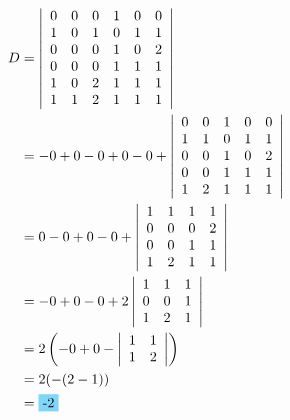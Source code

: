 \begin{align*}
	D&=\left|
	\begin{array}{cccccc}
		0&0&0&1&0&0 \\
		1&0&1&0&1&1 \\
		0&0&0&1&0&2 \\
		0&0&0&1&1&1 \\
		1&0&2&1&1&1 \\
		1&1&2&1&1&1 \\
	\end{array}
	\right| \\
	&= -0+0-0+0-0+\left|
	\begin{array}{ccccc}
		0&0&1&0&0 \\
		1&1&0&1&1 \\
		0&0&1&0&2 \\
		0&0&1&1&1 \\
		1&2&1&1&1 \\
	\end{array}
	\right| \\
	&= 0-0+0-0+\left|
	\begin{array}{cccc}
		1&1&1&1 \\
		0&0&0&2 \\
		0&0&1&1 \\
		1&2&1&1 \\
	\end{array}
	\right| \\
	&= -0+0-0+2\left|
	\begin{array}{ccc}
		1&1&1 \\
		0&0&1 \\
		1&2&1 \\
	\end{array}
	\right| \\
	&= 2\left(-0+0-\left|
	\begin{array}{cc}
		1&1 \\
		1&2 \\
	\end{array}
	\right|\right) \\
	&=2(-(2-1)) \\
	&=\hlbox{-2}
\end{align*}